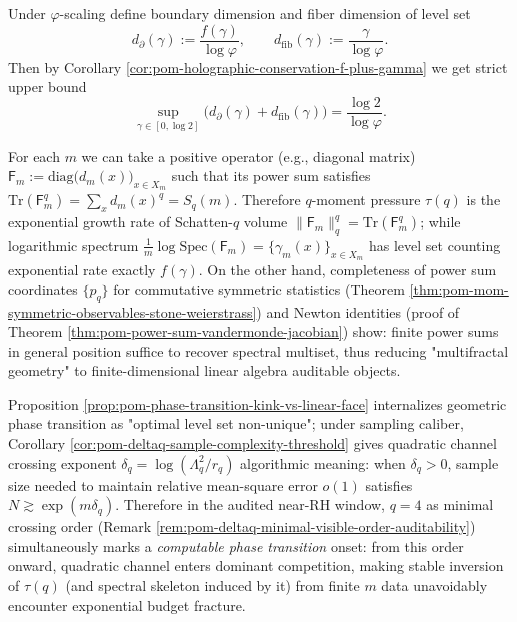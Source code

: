 \begin{corollary}\label{cor:pom-holographic-dimension-sum-bound}
Under \(\varphi\)-scaling define boundary dimension and fiber dimension of level set
\[
d_{\partial}(\gamma):=\frac{f(\gamma)}{\log\varphi},\qquad
d_{\mathrm{fib}}(\gamma):=\frac{\gamma}{\log\varphi}.
\]
Then by Corollary \ref{cor:pom-holographic-conservation-f-plus-gamma} we get strict upper bound
\[
\boxed{\;
\sup_{\gamma\in[0,\log 2]}\bigl(d_{\partial}(\gamma)+d_{\mathrm{fib}}(\gamma)\bigr)=\frac{\log 2}{\log\varphi}.\;}
\]
\end{corollary}

\begin{remark}\label{rem:pom-matrixization-spectrum-density-schatten-det}
For each \(m\) we can take a positive operator (e.g., diagonal matrix)
\(
\mathsf F_m:=\mathrm{diag}\bigl(d_m(x)\bigr)_{x\in X_m}
\)
such that its power sum satisfies
\(
\mathrm{Tr}(\mathsf F_m^q)=\sum_x d_m(x)^q=S_q(m)
\).
Therefore \(q\)-moment pressure \(\tau(q)\) is the exponential growth rate of Schatten-\(q\) volume \(\|\mathsf F_m\|_q^q=\mathrm{Tr}(\mathsf F_m^q)\);
while logarithmic spectrum
\(
\frac{1}{m}\log\mathrm{Spec}(\mathsf F_m)=\{\gamma_m(x)\}_{x\in X_m}
\)
has level set counting exponential rate exactly \(f(\gamma)\).
On the other hand, completeness of power sum coordinates \(\{p_q\}\) for commutative symmetric statistics (Theorem \ref{thm:pom-mom-symmetric-observables-stone-weierstrass}) and Newton identities (proof of Theorem \ref{thm:pom-power-sum-vandermonde-jacobian}) show: finite power sums in general position suffice to recover spectral multiset, thus reducing "multifractal geometry" to finite-dimensional linear algebra auditable objects.
\end{remark}

\begin{remark}\label{rem:pom-computational-phase-transition-deltaq}
Proposition \ref{prop:pom-phase-transition-kink-vs-linear-face} internalizes geometric phase transition as "optimal level set non-unique";
under sampling caliber, Corollary \ref{cor:pom-deltaq-sample-complexity-threshold} gives quadratic channel crossing exponent
\(\delta_q=\log(\Lambda_q^2/r_q)\) algorithmic meaning: when \(\delta_q>0\), sample size needed to maintain relative mean-square error \(o(1)\) satisfies \(N\gtrsim \exp(m\delta_q)\).
Therefore in the audited near-RH window, \(q=4\) as minimal crossing order (Remark \ref{rem:pom-deltaq-minimal-visible-order-auditability}) simultaneously marks a \emph{computable phase transition} onset: from this order onward, quadratic channel enters dominant competition, making stable inversion of \(\tau(q)\) (and spectral skeleton induced by it) from finite \(m\) data unavoidably encounter exponential budget fracture.
\end{remark}

